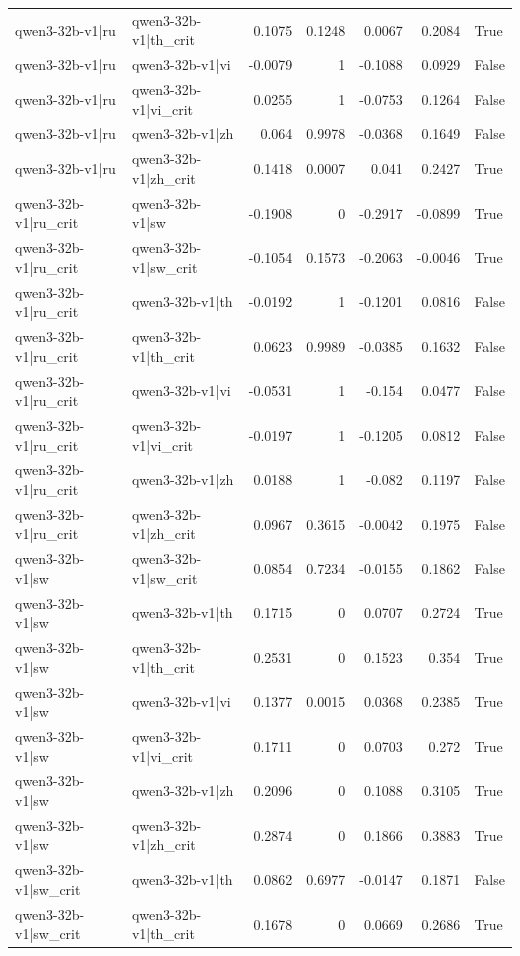 \begin{table}
\begin{tabular}{l l r r r r l}
qwen3-32b-v1|ru & qwen3-32b-v1|th_crit & 0.1075 & 0.1248 & 0.0067 & 0.2084 & True \\
qwen3-32b-v1|ru & qwen3-32b-v1|vi & -0.0079 & 1 & -0.1088 & 0.0929 & False \\
qwen3-32b-v1|ru & qwen3-32b-v1|vi_crit & 0.0255 & 1 & -0.0753 & 0.1264 & False \\
qwen3-32b-v1|ru & qwen3-32b-v1|zh & 0.064 & 0.9978 & -0.0368 & 0.1649 & False \\
qwen3-32b-v1|ru & qwen3-32b-v1|zh_crit & 0.1418 & 0.0007 & 0.041 & 0.2427 & True \\
qwen3-32b-v1|ru_crit & qwen3-32b-v1|sw & -0.1908 & 0 & -0.2917 & -0.0899 & True \\
qwen3-32b-v1|ru_crit & qwen3-32b-v1|sw_crit & -0.1054 & 0.1573 & -0.2063 & -0.0046 & True \\
qwen3-32b-v1|ru_crit & qwen3-32b-v1|th & -0.0192 & 1 & -0.1201 & 0.0816 & False \\
qwen3-32b-v1|ru_crit & qwen3-32b-v1|th_crit & 0.0623 & 0.9989 & -0.0385 & 0.1632 & False \\
qwen3-32b-v1|ru_crit & qwen3-32b-v1|vi & -0.0531 & 1 & -0.154 & 0.0477 & False \\
qwen3-32b-v1|ru_crit & qwen3-32b-v1|vi_crit & -0.0197 & 1 & -0.1205 & 0.0812 & False \\
qwen3-32b-v1|ru_crit & qwen3-32b-v1|zh & 0.0188 & 1 & -0.082 & 0.1197 & False \\
qwen3-32b-v1|ru_crit & qwen3-32b-v1|zh_crit & 0.0967 & 0.3615 & -0.0042 & 0.1975 & False \\
qwen3-32b-v1|sw & qwen3-32b-v1|sw_crit & 0.0854 & 0.7234 & -0.0155 & 0.1862 & False \\
qwen3-32b-v1|sw & qwen3-32b-v1|th & 0.1715 & 0 & 0.0707 & 0.2724 & True \\
qwen3-32b-v1|sw & qwen3-32b-v1|th_crit & 0.2531 & 0 & 0.1523 & 0.354 & True \\
qwen3-32b-v1|sw & qwen3-32b-v1|vi & 0.1377 & 0.0015 & 0.0368 & 0.2385 & True \\
qwen3-32b-v1|sw & qwen3-32b-v1|vi_crit & 0.1711 & 0 & 0.0703 & 0.272 & True \\
qwen3-32b-v1|sw & qwen3-32b-v1|zh & 0.2096 & 0 & 0.1088 & 0.3105 & True \\
qwen3-32b-v1|sw & qwen3-32b-v1|zh_crit & 0.2874 & 0 & 0.1866 & 0.3883 & True \\
qwen3-32b-v1|sw_crit & qwen3-32b-v1|th & 0.0862 & 0.6977 & -0.0147 & 0.1871 & False \\
qwen3-32b-v1|sw_crit & qwen3-32b-v1|th_crit & 0.1678 & 0 & 0.0669 & 0.2686 & True \\

\end{tabular}
\end{table}
